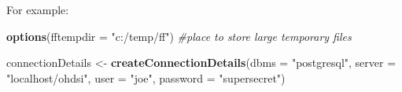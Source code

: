 \documentclass[
]{article}
\newenvironment{Shaded}{\begin{snugshade}}{\end{snugshade}}
\newcommand{\CommentTok}[1]{\textcolor[rgb]{0.56,0.35,0.01}{\textit{#1}}}
\newcommand{\DataTypeTok}[1]{\textcolor[rgb]{0.13,0.29,0.53}{#1}}
\newcommand{\KeywordTok}[1]{\textcolor[rgb]{0.13,0.29,0.53}{\textbf{#1}}}
\newcommand{\NormalTok}[1]{#1}
\newcommand{\StringTok}[1]{\textcolor[rgb]{0.31,0.60,0.02}{#1}}
\begin{document}
For example:

\begin{Shaded}
\begin{Highlighting}[]
\KeywordTok{options}\NormalTok{(}\DataTypeTok{fftempdir =} \StringTok{"c:/temp/ff"}\NormalTok{) }\CommentTok{#place to store large temporary files}

\NormalTok{connectionDetails <-}\StringTok{ }\KeywordTok{createConnectionDetails}\NormalTok{(}\DataTypeTok{dbms =} \StringTok{"postgresql"}\NormalTok{,}
                                              \DataTypeTok{server =} \StringTok{"localhost/ohdsi"}\NormalTok{,}
                                              \DataTypeTok{user =} \StringTok{"joe"}\NormalTok{,}
                                              \DataTypeTok{password =} \StringTok{"supersecret"}\NormalTok{)}


\end{Highlighting}
\end{Shaded}
\end{document}
